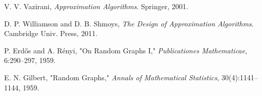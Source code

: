 \documentclass[12pt]{article}
\begin{document}
\begin{thebibliography}{9}
V. V. Vazirani, \emph{Approximation Algorithms}. Springer, 2001.

D. P. Williamson and D. B. Shmoys, \emph{The Design of Approximation Algorithms}.
Cambridge Univ. Press, 2011.

P. Erd\H{o}s and A. R\'enyi, "On Random Graphs I," \emph{Publicationes Mathematicae}, 6:290--297, 1959.

E. N. Gilbert, "Random Graphs," \emph{Annals of Mathematical Statistics}, 30(4):1141--1144, 1959.
\end{thebibliography}
\end{document}
